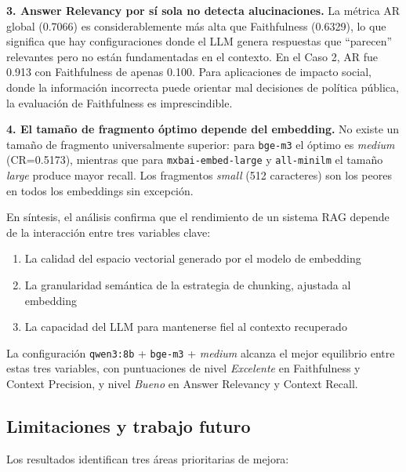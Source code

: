 \documentclass{article}
\begin{document}
\textbf{3. Answer Relevancy por sí sola no detecta alucinaciones.} La métrica
AR global (0.7066) es considerablemente más alta que Faithfulness (0.6329), lo
que significa que hay configuraciones donde el LLM genera respuestas que
``parecen'' relevantes pero no están fundamentadas en el contexto. En el Caso 2,
AR fue 0.913 con Faithfulness de apenas 0.100. Para aplicaciones de impacto
social, donde la información incorrecta puede orientar mal decisiones de
política pública, la evaluación de Faithfulness es imprescindible.

\textbf{4. El tamaño de fragmento óptimo depende del embedding.} No existe un
tamaño de fragmento universalmente superior: para \texttt{bge-m3} el óptimo es
\textit{medium} (CR=0.5173), mientras que para \texttt{mxbai-embed-large} y
\texttt{all-minilm} el tamaño \textit{large} produce mayor recall. Los
fragmentos \textit{small} (512 caracteres) son los peores en todos los
embeddings sin excepción.

En síntesis, el análisis confirma que el rendimiento de un sistema RAG depende
de la interacción entre tres variables clave:

\begin{enumerate}
\item La calidad del espacio vectorial generado por el modelo de embedding
\item La granularidad semántica de la estrategia de chunking, ajustada al embedding
\item La capacidad del LLM para mantenerse fiel al contexto recuperado
\end{enumerate}

La configuración \texttt{qwen3:8b} + \texttt{bge-m3} + \textit{medium} alcanza
el mejor equilibrio entre estas tres variables, con puntuaciones de nivel
\textit{Excelente} en Faithfulness y Context Precision, y nivel \textit{Bueno}
en Answer Relevancy y Context Recall.

\subsection{Limitaciones y trabajo futuro}

Los resultados identifican tres áreas prioritarias de mejora:
\end{document}
